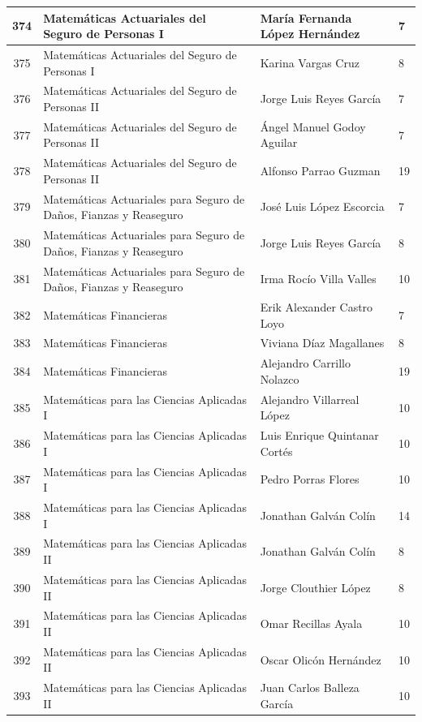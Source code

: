 {\begin{longtable}{|c|p{6.5cm}|p{5cm}|p{1.5cm}|}
  374 & Matemáticas Actuariales del Seguro de Personas I & María Fernanda López Hernández & 7 \\ \hline
  375 & Matemáticas Actuariales del Seguro de Personas I & Karina Vargas Cruz & 8 \\ \hline
  376 & Matemáticas Actuariales del Seguro de Personas II & Jorge Luis Reyes García & 7 \\ \hline
  377 & Matemáticas Actuariales del Seguro de Personas II & Ángel Manuel Godoy Aguilar & 7 \\ \hline
  378 & Matemáticas Actuariales del Seguro de Personas II & Alfonso Parrao Guzman & 19 \\ \hline
  379 & Matemáticas Actuariales para Seguro de Daños, Fianzas y Reaseguro & José Luis López Escorcia & 7 \\ \hline
  380 & Matemáticas Actuariales para Seguro de Daños, Fianzas y Reaseguro & Jorge Luis Reyes García & 8 \\ \hline
  381 & Matemáticas Actuariales para Seguro de Daños, Fianzas y Reaseguro & Irma Rocío Villa Valles & 10 \\ \hline
  382 & Matemáticas Financieras & Erik Alexander Castro Loyo & 7 \\ \hline
  383 & Matemáticas Financieras & Viviana Díaz Magallanes & 8 \\ \hline
  384 & Matemáticas Financieras & Alejandro Carrillo Nolazco & 19 \\ \hline
  385 & Matemáticas para las Ciencias Aplicadas I & Alejandro Villarreal López & 10 \\ \hline
  386 & Matemáticas para las Ciencias Aplicadas I & Luis Enrique Quintanar Cortés & 10 \\ \hline
  387 & Matemáticas para las Ciencias Aplicadas I & Pedro Porras Flores & 10 \\ \hline
  388 & Matemáticas para las Ciencias Aplicadas I & Jonathan Galván Colín & 14 \\ \hline
  389 & Matemáticas para las Ciencias Aplicadas II & Jonathan Galván Colín & 8 \\ \hline
  390 & Matemáticas para las Ciencias Aplicadas II & Jorge Clouthier López & 8 \\ \hline
  391 & Matemáticas para las Ciencias Aplicadas II & Omar Recillas Ayala & 10 \\ \hline
  392 & Matemáticas para las Ciencias Aplicadas II & Oscar Olicón Hernández & 10 \\ \hline
  393 & Matemáticas para las Ciencias Aplicadas II & Juan Carlos Balleza García & 10 \\ \hline

\end{longtable}}
